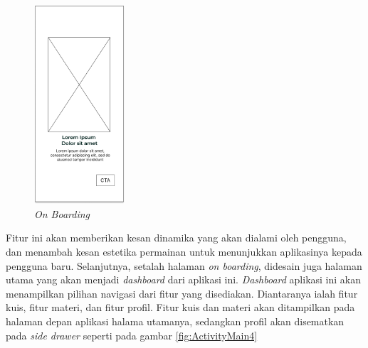 \begin{figure}[H]
	\centering
	\includegraphics[width=0.3\textwidth]{contents/chapter-3/images/MF-Boarding.png}
	\caption{\textit{On Boarding}}
	\label{Fig:OnBoarding}
\end{figure}
\newpage
Fitur ini akan memberikan kesan dinamika yang akan dialami oleh pengguna, dan menambah kesan estetika permainan untuk menunjukkan aplikasinya kepada pengguna baru.
Selanjutnya, setalah halaman \textit{on boarding}, didesain juga halaman utama yang akan menjadi \textit{dashboard} dari aplikasi ini.
\textit{Dashboard} aplikasi ini akan menampilkan pilihan navigasi dari fitur yang disediakan. Diantaranya ialah fitur kuis, fitur materi, dan fitur profil. 
Fitur kuis dan materi akan ditampilkan pada halaman depan aplikasi halama utamanya, sedangkan profil akan disematkan pada \textit{side drawer} seperti pada gambar \ref*{fig:ActivityMain4}
